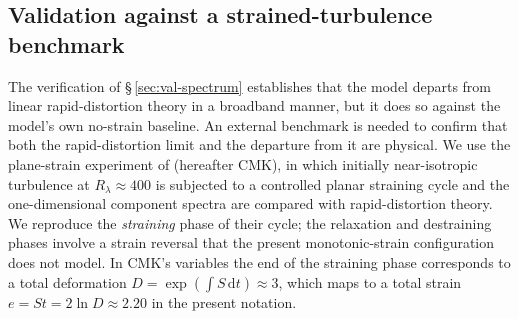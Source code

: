 \documentclass[lineno]{JFM-FLM_Au}
\providecommand{\DIFdelend}{} %
\begin{document}

\DIFdelend \subsection{Validation against a strained-turbulence benchmark}
\label{sec:cmk}

The verification of \S\,\ref{sec:val-spectrum} establishes that the model
departs from linear rapid-distortion theory in a broadband manner, but it does
so against the model's own no-strain baseline. An external benchmark is needed
to confirm that both the rapid-distortion limit and the departure from it are
physical. We use the plane-strain experiment of \citet{ChenMeneveauKatz2006}
(hereafter CMK), in which initially near-isotropic turbulence at
$R_\lambda\approx400$ is subjected to a controlled planar straining cycle and
the one-dimensional component spectra are compared with rapid-distortion theory.
We reproduce the \emph{straining} phase of their cycle; the relaxation and
destraining phases involve a strain reversal that the present monotonic-strain
configuration does not model. In CMK's variables the end of the straining phase
corresponds to a total deformation $D=\exp(\int S\,\mathrm{d}t)\approx3$, which
maps to a total strain $e=St=2\ln D\approx2.20$ in the present notation.
\end{document}
